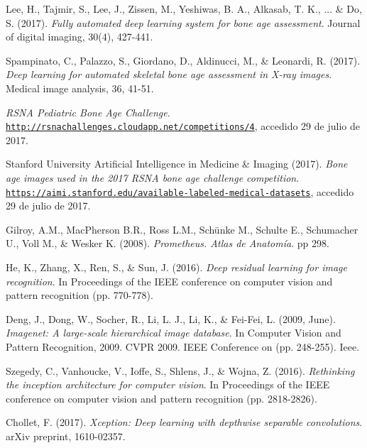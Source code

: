 \documentclass[conference]{IEEEtran}
\begin{document}
\begin{thebibliography}{00}
Lee, H., Tajmir, S., Lee, J., Zissen, M., Yeshiwas, B. A., Alkasab, T. K., ... \& Do, S. (2017).
\textit{Fully automated deep learning system for bone age assessment}.
Journal of digital imaging, 30(4), 427-441.

Spampinato, C., Palazzo, S., Giordano, D., Aldinucci, M., \& Leonardi, R. (2017).
\textit{Deep learning for automated skeletal bone age assessment in X-ray images}.
Medical image analysis, 36, 41-51.

\textit{RSNA Pediatric Bone Age Challenge}.
\\\texttt{\url{http://rsnachallenges.cloudapp.net/competitions/4}}, accedido 29 de julio de 2017.

Stanford University Artificial Intelligence in Medicine \& Imaging (2017).
\textit{Bone age images used in the 2017 RSNA bone age challenge competition}.
\\\texttt{\url{https://aimi.stanford.edu/available-labeled-medical-datasets}}, accedido 29 de julio de 2017.

Gilroy, A.M., MacPherson B.R., Ross L.M., Schünke M., Schulte E., Schumacher U., Voll M., \& Wesker K. (2008).
\textit{Prometheus. Atlas de Anatomía}.
pp 298.

He, K., Zhang, X., Ren, S., \& Sun, J. (2016). 
\textit{Deep residual learning for image recognition}.
In Proceedings of the IEEE conference on computer vision and pattern recognition (pp. 770-778).

Deng, J., Dong, W., Socher, R., Li, L. J., Li, K., \& Fei-Fei, L. (2009, June). 
\textit{Imagenet: A large-scale hierarchical image database}. In Computer Vision and Pattern Recognition, 2009. CVPR 2009. IEEE Conference on (pp. 248-255). Ieee.


Szegedy, C., Vanhoucke, V., Ioffe, S., Shlens, J., \& Wojna, Z. (2016). 
\textit{Rethinking the inception architecture for computer vision}. In Proceedings of the IEEE conference on computer vision and pattern recognition (pp. 2818-2826).


Chollet, F. (2017).
\textit{Xception: Deep learning with depthwise separable convolutions}. arXiv preprint, 1610-02357.
\end{thebibliography}
\end{document}
